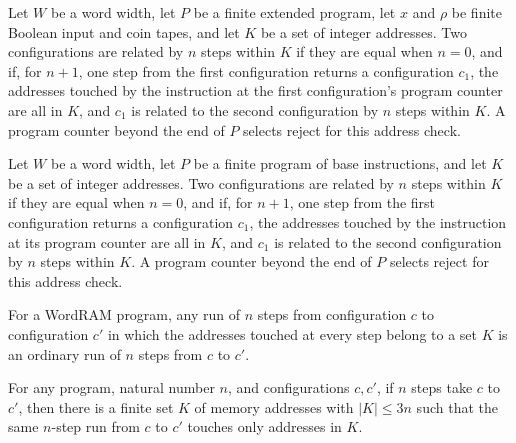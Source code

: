 \begin{definition}
\label{WordRAM.XStepsIn}
\leanok
{}
Let $W$ be a word width, let $P$ be a finite extended program, let $x$ and $\rho$ be
finite Boolean input and coin tapes, and let $K$ be a set of integer addresses. Two
configurations are related by $n$ steps within $K$ if they are equal when $n=0$, and if,
for $n+1$, one step from the first configuration returns a configuration $c_1$, the
addresses touched by the instruction at the first configuration's program counter are
all in $K$, and $c_1$ is related to the second configuration by $n$ steps within $K$. A
program counter beyond the end of $P$ selects reject for this address check.
\end{definition}

\begin{definition}
\label{WordRAM.StepsIn}
\leanok
{}
Let $W$ be a word width, let $P$ be a finite program of base instructions, and let $K$
be a set of integer addresses. Two configurations are related by $n$ steps within $K$ if
they are equal when $n=0$, and if, for $n+1$, one step from the first configuration
returns a configuration $c_1$, the addresses touched by the instruction at its program
counter are all in $K$, and $c_1$ is related to the second configuration by $n$ steps
within $K$. A program counter beyond the end of $P$ selects reject for this address
check.
\end{definition}

\begin{theorem}
\label{WordRAM.StepsIn.toSteps}
\leanok
{}
For a WordRAM program, any run of $n$ steps from configuration $c$ to configuration $c'$
in which the addresses touched at every step belong to a set $K$ is an ordinary run of
$n$ steps from $c$ to $c'$.
\end{theorem}

\begin{theorem}
\label{WordRAM.Steps.exists_stepsIn}
\leanok
{}
For any program, natural number $n$, and configurations $c,c'$, if $n$ steps take $c$ to
$c'$, then there is a finite set $K$ of memory addresses with $|K|\le 3n$ such that the
same $n$-step run from $c$ to $c'$ touches only addresses in $K$.
\end{theorem}

